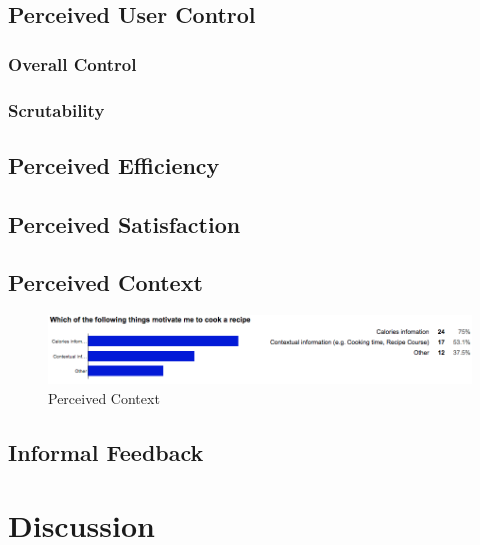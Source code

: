 \subsection{Perceived User Control}
\subsubsection{Overall Control}
\subsubsection{Scrutability}

\subsection{Perceived Efficiency}

\subsection{Perceived Satisfaction}


\subsection{Perceived Context}

\begin{figure}
	\centering
	\includegraphics[width=0.7\linewidth]{figures/ch5_stat_context}
	\caption{Perceived Context}
	\label{fig:ch5_stat_context}
\end{figure}


\subsection{Informal Feedback}

\section{Discussion}
